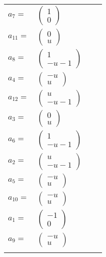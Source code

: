 \documentclass[1p]{elsarticle_modified}
\theoremstyle{definition}
\begin{document}
\begin{tabular}{m{7pt} m{180pt} m{7pt} m{180pt} }
\flushright $a_{7}=$&$\begin{pmatrix}1\\0\end{pmatrix}$ \\
\flushright $a_{11}=$&$\begin{pmatrix}0\\u\end{pmatrix}$ \\
\flushright $a_{8}=$&$\begin{pmatrix}1\\- u-1\end{pmatrix}$ \\
\flushright $a_{4}=$&$\begin{pmatrix}- u\\u\end{pmatrix}$ \\
\flushright $a_{12}=$&$\begin{pmatrix}u\\- u-1\end{pmatrix}$ \\
\flushright $a_{3}=$&$\begin{pmatrix}0\\u\end{pmatrix}$ \\
\flushright $a_{6}=$&$\begin{pmatrix}1\\- u-1\end{pmatrix}$ \\
\flushright $a_{2}=$&$\begin{pmatrix}u\\- u-1\end{pmatrix}$ \\
\flushright $a_{5}=$&$\begin{pmatrix}- u\\u\end{pmatrix}$ \\
\flushright $a_{10}=$&$\begin{pmatrix}- u\\u\end{pmatrix}$ \\
\flushright $a_{1}=$&$\begin{pmatrix}-1\\0\end{pmatrix}$ \\
\flushright $a_{9}=$&$\begin{pmatrix}- u\\u\end{pmatrix}$\\&\end{tabular}
\end{document}
